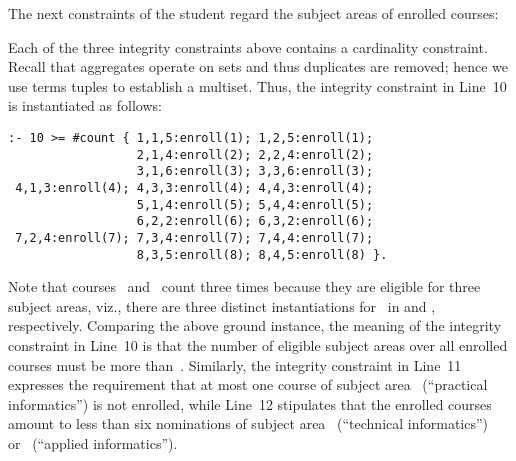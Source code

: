 \begin{example}
The next constraints of the student regard the subject areas of enrolled courses:
%

%
Each of the three integrity constraints above contains a cardinality constraint.
Recall that aggregates operate on sets and thus duplicates are removed;
hence we use terms tuples to establish a multiset.
Thus, the integrity constraint in Line~10 is instantiated as follows:
%
\begin{lstlisting}[firstnumber=10,stepnumber=10]
:- 10 >= #count { 1,1,5:enroll(1); 1,2,5:enroll(1); 
                  2,1,4:enroll(2); 2,2,4:enroll(2); 
                  3,1,6:enroll(3); 3,3,6:enroll(3); 
 4,1,3:enroll(4); 4,3,3:enroll(4); 4,4,3:enroll(4); 
                  5,1,4:enroll(5); 5,4,4:enroll(5); 
                  6,2,2:enroll(6); 6,3,2:enroll(6); 
 7,2,4:enroll(7); 7,3,4:enroll(7); 7,4,4:enroll(7); 
                  8,3,5:enroll(8); 8,4,5:enroll(8) }. 
\end{lstlisting}
%
Note that courses~ and~ count three times because
they are eligible for three subject areas, viz., there are three
distinct instantiations for~ in
 and
, respectively.
Comparing the above ground instance,
the meaning of the integrity constraint in Line~10 is that the 
number of eligible subject areas over all enrolled courses
must be more than~.
Similarly, the integrity constraint in Line~11 expresses the requirement
that at most one course of subject area~ (``practical informatics'')
is not enrolled,
while Line~12 stipulates that the enrolled courses
amount to less than six nominations of
subject area~ (``technical informatics'') 
or~ (``applied informatics'').


\end{example}
